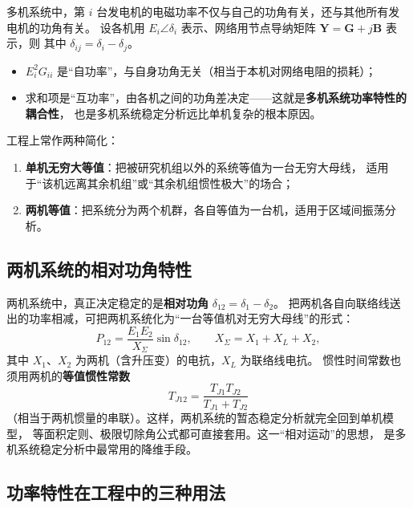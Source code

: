多机系统中，第 $i$ 台发电机的电磁功率不仅与自己的功角有关，还与其他所有发电机的功角有关。
设各机用 $E_i\angle\delta_i$ 表示、网络用节点导纳矩阵 $\boldsymbol Y=\boldsymbol G+j\boldsymbol B$ 表示，则
其中 $\delta_{ij}=\delta_i-\delta_j$。
\begin{itemize}
  \item $E_i^{2}G_{ii}$ 是“自功率”，与自身功角无关（相当于本机对网络电阻的损耗）；
  \item 求和项是“互功率”，由各机之间的功角差决定——这就是\textbf{多机系统功率特性的耦合性}，
        也是多机系统稳定分析远比单机复杂的根本原因。
\end{itemize}
工程上常作两种简化：
\begin{enumerate}
  \item \textbf{单机无穷大等值}：把被研究机组以外的系统等值为一台无穷大母线，
        适用于“该机远离其余机组”或“其余机组惯性极大”的场合；
  \item \textbf{两机等值}：把系统分为两个机群，各自等值为一台机，适用于区域间振荡分析。
\end{enumerate}

\subsection{两机系统的相对功角特性}

两机系统中，真正决定稳定的是\textbf{相对功角} $\delta_{12}=\delta_1-\delta_2$。
把两机各自向联络线送出的功率相减，可把两机系统化为“一台等值机对无穷大母线”的形式：
\begin{equation}
  P_{12}=\frac{E_1E_2}{X_{\Sigma}}\sin\delta_{12},
  \qquad X_{\Sigma}=X_1+X_{L}+X_2 ,
\end{equation}
其中 $X_1$、$X_2$ 为两机（含升压变）的电抗，$X_L$ 为联络线电抗。
惯性时间常数也须用两机的\textbf{等值惯性常数}
\begin{equation}
  T_{J12}=\frac{T_{J1}T_{J2}}{T_{J1}+T_{J2}}
\end{equation}
（相当于两机惯量的串联）。这样，两机系统的暂态稳定分析就完全回到单机模型，
等面积定则、极限切除角公式都可直接套用。这一“相对运动”的思想，
是多机系统稳定分析中最常用的降维手段。

\subsection{功率特性在工程中的三种用法}

